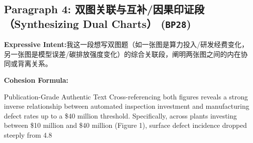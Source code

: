 \subsection*{Paragraph 4: 双图关联与互补/因果印证段（Synthesizing Dual Charts） (\texttt{BP28})}
\noindent\textbf{Expressive Intent:}\enspace 我这一段想写双图题（如一张图是算力投入/研发经费变化，另一张图是模型误差/碳排放强度变化）的综合关联段，阐明两张图之间的内在协同或背离关系。\par
\noindent\textbf{Cohesion Formula:}\par\vspace{4pt}
\begin{ExampleBox}{Publication-Grade Authentic Text}
Cross-referencing both figures reveals a strong inverse relationship between automated inspection investment and manufacturing defect rates up to a \$40 million threshold. Specifically, across plants investing between \$10 million and \$40 million (Figure 1), surface defect incidence dropped steeply from 4.8%
\end{ExampleBox}
